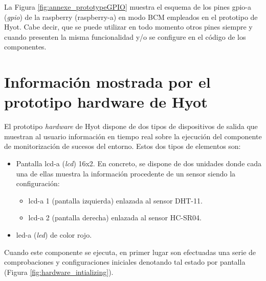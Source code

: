 \documentclass[12pt,a4paper, twoside]{report}
\begin{document}
	La Figura \ref{fig:annexe_prototypeGPIO} muestra el esquema de los pines \gls{gpio-a} (\textit{\gls{gpio}}) de la \gls{raspberry} (\gls{raspberry-a}) en modo BCM \cite{pinout:rpi} empleados en el \gls{prototipo} de Hyot. Cabe decir, que se puede utilizar en todo momento otros pines siempre y cuando presenten la misma funcionalidad y/o se configure en el código de los componentes.
	
		
	\chapter{Información mostrada por el prototipo hardware de Hyot}\label{hardware} 
	
	El \gls{prototipo} \textit{hardware} de Hyot dispone de dos tipos de dispositivos de salida que muestran al usuario información en tiempo real sobre la ejecución del componente de monitorización de sucesos del entorno. Estos dos tipos de elementos son:
	
	\begin{itemize}
		\item Pantalla \gls{lcd-a} (\textit{\gls{lcd}}) 16x2. En concreto, se dispone de dos unidades donde cada una de ellas muestra la información procedente de un sensor siendo la configuración:
		
		\begin{itemize}
			\item \gls{lcd-a} 1 (pantalla izquierda) enlazada al \gls{sensor} DHT-11.
			\item \gls{lcd-a} 2 (pantalla derecha) enlazada al \gls{sensor} HC-SR04.
		\end{itemize}
		
		\item \gls{led-a} (\textit{\gls{led}}) de color rojo. 
	\end{itemize}
	
	Cuando este componente se ejecuta, en primer lugar son efectuadas una serie de comprobaciones y configuraciones iniciales denotando tal estado por pantalla (Figura \ref{fig:hardware_intializing}). \\
	
\end{document}
